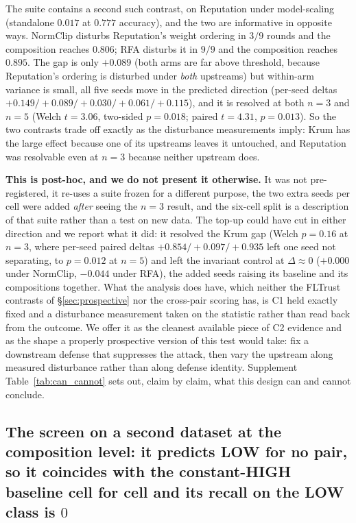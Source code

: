 \documentclass{article}
\begin{document}
The suite contains a second such contrast, on Reputation under model-scaling (standalone $0.017$ at $0.777$ accuracy), and the two are informative in opposite ways. NormClip disturbs Reputation's weight ordering in $3/9$ rounds and the composition reaches $0.806$; RFA disturbs it in $9/9$ and the composition reaches $0.895$. The gap is only $+0.089$ (both arms are far above threshold, because Reputation's ordering is disturbed under \emph{both} upstreams) but within-arm variance is small, all five seeds move in the predicted direction (per-seed deltas $+0.149 / +0.089 / +0.030 / +0.061 / +0.115$), and it is resolved at both $n{=}3$ and $n{=}5$ (Welch $t = 3.06$, two-sided $p = 0.018$; paired $t = 4.31$, $p = 0.013$). So the two contrasts trade off exactly as the disturbance measurements imply: Krum has the large effect because one of its upstreams leaves it untouched, and Reputation was resolvable even at $n{=}3$ because neither upstream does.

\textbf{This is post-hoc, and we do not present it otherwise.} It was not pre-registered, it re-uses a suite frozen for a different purpose, the two extra seeds per cell were added \emph{after} seeing the $n{=}3$ result, and the six-cell split is a description of that suite rather than a test on new data. The top-up could have cut in either direction and we report what it did: it resolved the Krum gap (Welch $p = 0.16$ at $n{=}3$, where per-seed paired deltas $+0.854 / +0.097 / +0.935$ left one seed not separating, to $p = 0.012$ at $n{=}5$) and left the invariant control at $\Delta \approx 0$ ($+0.000$ under NormClip, $-0.044$ under RFA), the added seeds raising its baseline and its compositions together. What the analysis does have, which neither the FLTrust contrasts of §\ref{sec:prospective} nor the cross-pair scoring has, is C1 held exactly fixed and a disturbance measurement taken on the statistic rather than read back from the outcome. We offer it as the cleanest available piece of C2 evidence and as the shape a properly prospective version of this test would take: fix a downstream defense that suppresses the attack, then vary the upstream along measured disturbance rather than along defense identity. Supplement Table~\ref{tab:can_cannot} sets out, claim by claim, what this design can and cannot conclude.

\subsection{The screen on a second dataset at the composition level: it predicts LOW for no pair, so it coincides with the constant-HIGH baseline cell for cell and its recall on the LOW class is $0$}
\label{app:cifar100_menu}
\end{document}
